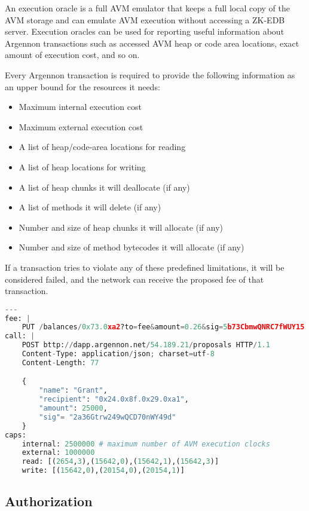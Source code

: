 An execution oracle is a full AVM emulator that keeps a full local copy of the AVM storage and can emulate AVM
execution without accessing a ZK-EDB server. Execution oracles can be used for reporting useful information about
Argennon transactions such as accessed AVM heap or code area locations, exact amount of execution cost,
and so on.

Every Argennon transaction is required to provide the following information as an upper bound for the
resources it needs:

\begin{itemize}
    \item Maximum internal execution cost
    \item Maximum external execution cost
    \item A list of heap/code-area locations for reading
    \item A list of heap locations for writing
    \item A list of heap chunks it will deallocate (if any)
    \item A list of methods it will delete (if any)
    \item Number and size of heap chunks it will allocate (if any)
    \item Number and size of method bytecodes it will allocate (if any)
\end{itemize}

If a transaction tries to violate any of these predefined limitations, it will be considered failed, and the network
can receive the proposed fee of that transaction.

\begin{lstlisting}[language=python, frame=TB, float, title=An Argennon transaction in YAML format,
    label={lst:txn-example}]
---
fee: |
    PUT /balances/0x73.0xa2?to=fee&amount=0.26&sig=5b73CbmwQNRC7fWUY15 HTTP/1.1
call: |
    POST bttp://dapp.argennon.net/54.189.21/proposals HTTP/1.1
    Content-Type: application/json; charset=utf-8
    Content-Length: 77

    {
        "name": "Grant",
        "recipient": "0x24.0x8f.0x29.0xa1",
        "amount": 25000,
        "sig"= "2a36Gtrw249wQCD70nWY49d"
    }
caps:
    internal: 2500000 # maximum number of AVM execution clocks
    external: 1000000
    read: [(2654,3),(15642,0),(15642,1),(15642,3)]
    write: [(15642,0),(20154,0),(20154,1)]
\end{lstlisting}

\subsection{Authorization}\label{subsec:txn-auth}


